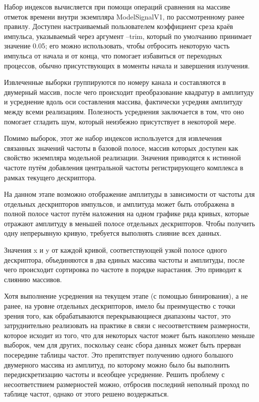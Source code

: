 \documentclass{report}
\begin{document}
Набор индексов вычисляется при помощи операций сравнения на массиве отметок времени внутри экземпляра ModelSignalV1, по рассмотренному ранее правилу. Доступен настраиваемый пользователем коэффициент среза краёв импульса, указываемый через аргумент --trim, который по умолчанию принимает значение 0.05; его можно использовать, чтобы отбросить некоторую часть импульса от начала и от конца, что помогает избавиться от переходных процессов, обычно присутствующих в моменты начала и завершения излучения.

Извлеченные выборки группируются по номеру канала и составляются в двумерный массив, после чего происходит преобразование квадратур в амплитуду и усреднение вдоль оси составления массива, фактически усредняя амплитуду между всеми реализациям. Полезность усреднения заключается в том, что оно помогает сгладить шум, который неизбежно присутствует в некоторой мере.

Помимо выборок, этот же набор индексов используется для извлечения связанных значений частоты в базовой полосе, массив которых доступен как свойство экземпляра модельной реализации. Значения приводятся к истинной частоте путём добавления центральной частоты регистрирующего комплекса в рамках текущего дескриптора.

На данном этапе возможно отображение амплитуды в зависимости от частоты для отдельных дескрипторов импульсов, и амплитуда может быть отображена в полной полосе частот путём наложения на одном графике ряда кривых, которые отражают амплитуду в меньшей полосе отдельных дескрипторов. Чтобы получить одну непрерывную кривую, требуется выполнять слияние всех данных.

Значения x и y от каждой кривой, соответствующей узкой полосе одного дескриптора, объединяются в два единых массива частоты и амплитуды, после чего происходит сортировка по частоте в порядке нарастания. Это приводит к слиянию массивов.

Хотя выполнение усреднения на текущем этапе (с помощью бинирования), а не ранее, на уровне отдельных дескрипторов, имело бы преимущество с точки зрения того, как обрабатываются перекрывающиеся диапазоны частот, это затруднительно реализовать на практике в связи с несоответствием размерности, которое исходит из того, что для некоторых частот может быть накоплено меньше выборок, чем для других, поскольку сеанс сбора данных может быть прерван посередине таблицы частот. Это препятствует получению одного большого двумерного массива из амплитуд, по которому можно было бы выполнить передискретизацию частоты и всеобщее усреднение. Решить проблему с несоответствием размерностей можно, отбросив последний неполный проход по таблице частот, однако от этого решено воздержаться.
\end{document}
